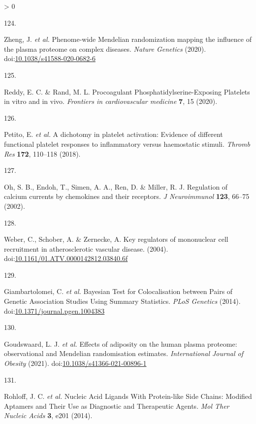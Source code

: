 \documentclass[11pt,twoside]{bristolthesis}
\newlength{\cslhangindent}
\newlength{\csllabelwidth}
\newenvironment{CSLReferences}[2] %
 {%
  \setlength{\parindent}{0pt}
  \ifodd #1 \everypar{\setlength{\hangindent}{\cslhangindent}}\ignorespaces\fi
  \ifnum #2 > 0
  \setlength{\parskip}{#2\baselineskip}
  \fi
 }%
 {}
\newcommand{\CSLLeftMargin}[1]{\parbox[t]{\csllabelwidth}{#1}}
\newcommand{\CSLRightInline}[1]{\parbox[t]{\linewidth - \csllabelwidth}{#1}\break}
\begin{document}
\begin{CSLReferences}{0}{0}
\leavevmode\hypertarget{ref-Zheng2020}{}%
\CSLLeftMargin{124. }
\CSLRightInline{Zheng, J. \emph{et al.} {Phenome-wide Mendelian randomization mapping the influence of the plasma proteome on complex diseases}. \emph{Nature Genetics} (2020). doi:\href{https://doi.org/10.1038/s41588-020-0682-6}{10.1038/s41588-020-0682-6}}

\leavevmode\hypertarget{ref-Reddy2020}{}%
\CSLLeftMargin{125. }
\CSLRightInline{Reddy, E. C. \& Rand, M. L. {Procoagulant Phosphatidylserine-Exposing Platelets in vitro and in vivo}. \emph{Frontiers in cardiovascular medicine} \textbf{7}, 15 (2020).}

\leavevmode\hypertarget{ref-Petito2018}{}%
\CSLLeftMargin{126. }
\CSLRightInline{Petito, E. \emph{et al.} {A dichotomy in platelet activation: Evidence of different functional platelet responses to inflammatory versus haemostatic stimuli}. \emph{Thromb Res} \textbf{172}, 110--118 (2018).}

\leavevmode\hypertarget{ref-Oh2002}{}%
\CSLLeftMargin{127. }
\CSLRightInline{Oh, S. B., Endoh, T., Simen, A. A., Ren, D. \& Miller, R. J. {Regulation of calcium currents by chemokines and their receptors}. \emph{J Neuroimmunol} \textbf{123}, 66--75 (2002).}

\leavevmode\hypertarget{ref-Weber2004}{}%
\CSLLeftMargin{128. }
\CSLRightInline{Weber, C., Schober, A. \& Zernecke, A. {Key regulators of mononuclear cell recruitment in atherosclerotic vascular disease}. (2004). doi:\href{https://doi.org/10.1161/01.ATV.0000142812.03840.6f}{10.1161/01.ATV.0000142812.03840.6f}}

\leavevmode\hypertarget{ref-Giambartolomei2014}{}%
\CSLLeftMargin{129. }
\CSLRightInline{Giambartolomei, C. \emph{et al.} {Bayesian Test for Colocalisation between Pairs of Genetic Association Studies Using Summary Statistics}. \emph{PLoS Genetics} (2014). doi:\href{https://doi.org/10.1371/journal.pgen.1004383}{10.1371/journal.pgen.1004383}}

\leavevmode\hypertarget{ref-Goudswaard2021}{}%
\CSLLeftMargin{130. }
\CSLRightInline{Goudswaard, L. J. \emph{et al.} {Effects of adiposity on the human plasma proteome: observational and Mendelian randomisation estimates}. \emph{International Journal of Obesity} (2021). doi:\href{https://doi.org/10.1038/s41366-021-00896-1}{10.1038/s41366-021-00896-1}}

\leavevmode\hypertarget{ref-Rohloff2014}{}%
\CSLLeftMargin{131. }
\CSLRightInline{Rohloff, J. C. \emph{et al.} {Nucleic Acid Ligands With Protein-like Side Chains: Modified Aptamers and Their Use as Diagnostic and Therapeutic Agents}. \emph{Mol Ther Nucleic Acids} \textbf{3}, e201 (2014).}


\end{CSLReferences}
\end{document}
